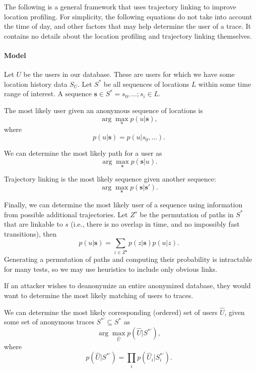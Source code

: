 The following is a general framework that uses trajectory linking to improve location profiling. For simplicity, the following equations do not take into account the time of day, and other factors that may help determine the user of a trace. It contains no details about the location profiling and trajectory linking themselves.

\paragraph*{Model}
Let $U$ be the users in our database. These are users for which we have some location history data $S_U$.
Let $S^*$ be all sequences of locations $L$ within some time range of interest.
A sequence $\mathbf{s}\in S^*=s_0,\dots; s_i\in L$.

The most likely user given an anonymous sequence of locations is
\begin{equation}
\arg\max_up(u|\mathbf{s}),
\end{equation}
where 
\begin{equation}
p(u|\mathbf{s}) = p(u|s_0,\dots).
\end{equation}

We can determine the most likely path for a user as
\begin{equation}
\arg\max_\mathbf{s} p(\mathbf{s}|u).
\end{equation}

Trajectory linking is the most likely sequence given another sequence:
\begin{equation}
\arg\max_\mathbf{s} p(\mathbf{s}|\mathbf{s'}).
\end{equation}

Finally, we can determine the most likely user of a sequence using information from possible additional trajectories. 
Let $Z^s$ be the permutation of paths in $S^*$ that are linkable to $s$ (i.e., there is no overlap in time, and no impossibly fast transitions), then
\begin{equation}
p(u|\mathbf s) = \sum_{z\in Z^{\mathbf s}} p(z|\mathbf s) p(u|z).
\end{equation}
Generating a permutation of paths and computing their probability is intractable for many tests, so we may use heuristics to include only obvious links.

If an attacker wishes to deanonymize an entire anonymized database, they would want to determine the most likely matching of users to traces. 

We can determine the most likely corresponding (ordered) set of users $\hat{U}$, given some set of anonymous traces $S^{*'}\subseteq S^*$ as
\begin{equation}
\arg\max_{\hat{U}} p(\hat{U}|S^{*'}),
\end{equation}
where
\begin{equation}
p(\hat{U}|S^{*'}) = \prod_i p(\hat{U}_i|S^{*'}_i).
\end{equation}

